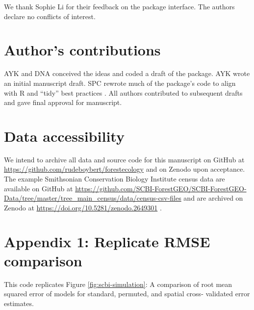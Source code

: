 \documentclass[12pt]{article}
\begin{document}
We thank Sophie Li for their feedback on the package interface. The
authors declare no conflicts of interest.

\hypertarget{authors-contributions}{%
\section{Author's contributions}\label{authors-contributions}}

AYK and DNA conceived the ideas and coded a draft of the package. AYK
wrote an initial manuscript draft. SPC rewrote much of the package's
code to align with R and ``tidy'' best practices
\citep{wickham_welcome_2019}. All authors contributed to subsequent
drafts and gave final approval for manuscript.

\hypertarget{data-accessibility}{%
\section{Data accessibility}\label{data-accessibility}}

We intend to archive all data and source code for this manuscript on
GitHub at \url{https://github.com/rudeboybert/forestecology} and on
Zenodo upon acceptance. The example Smithsonian Conservation Biology
Institute census data are available on GitHub at
\url{https://github.com/SCBI-ForestGEO/SCBI-ForestGEO-Data/tree/master/tree_main_census/data/census-csv-files}
and are archived on Zenodo at
\url{https://doi.org/10.5281/zenodo.2649301}
\citep{gonzalez-akre_scbi-forestgeoscbi-forestgeo-data_2020}.

\hypertarget{appendix-1-replicate-rmse-comparison}{%
\section{Appendix 1: Replicate RMSE
comparison}\label{appendix-1-replicate-rmse-comparison}}

This code replicates Figure \ref{fig:scbi-simulation}: A comparison of
root mean squared error of models for standard, permuted, and spatial
cross- validated error estimates.
\end{document}
